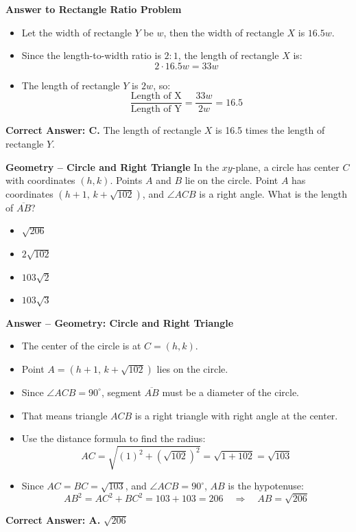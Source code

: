 \documentclass{beamer}
\begin{document}
\begin{frame}{\textbf{Answer to Rectangle Ratio Problem}}
\begin{itemize}
    \item Let the width of rectangle \( Y \) be \( w \), then the width of rectangle \( X \) is \( 16.5w \).
    \item Since the length-to-width ratio is \( 2:1 \), the length of rectangle \( X \) is:
    \[
    2 \cdot 16.5w = 33w
    \]
    \item The length of rectangle \( Y \) is \( 2w \), so:
    \[
    \frac{\text{Length of X}}{\text{Length of Y}} = \frac{33w}{2w} = 16.5
    \]
\end{itemize}

\textbf{Correct Answer: C. } The length of rectangle \( X \) is 16.5 times the length of rectangle \( Y \).
\end{frame}




\begin{frame}{\textbf{Geometry – Circle and Right Triangle}}
In the \(xy\)-plane, a circle has center \(C\) with coordinates \((h, k)\). Points \(A\) and \(B\) lie on the circle. Point \(A\) has coordinates \((h + 1,\, k + \sqrt{102})\), and \(\angle ACB\) is a right angle. What is the length of \(\overline{AB}\)?
\begin{itemize}
    \item[A.] \(\sqrt{206}\)
    \item[B.] \(2\sqrt{102}\)
    \item[C.] \(103\sqrt{2}\)
    \item[D.] \(103\sqrt{3}\)
\end{itemize}
\end{frame}



\begin{frame}{\textbf{Answer – Geometry: Circle and Right Triangle}}
\begin{itemize}
    \item The center of the circle is at \(C = (h, k)\).
    \item Point \(A = (h + 1,\, k + \sqrt{102})\) lies on the circle.
    \item Since \(\angle ACB = 90^\circ\), segment \(\overline{AB}\) must be a diameter of the circle.
    \item That means triangle \(ACB\) is a right triangle with right angle at the center.
    \item Use the distance formula to find the radius:
    \[
    AC = \sqrt{(1)^2 + (\sqrt{102})^2} = \sqrt{1 + 102} = \sqrt{103}
    \]
    \item Since \(AC = BC = \sqrt{103}\), and \(\angle ACB = 90^\circ\), \(AB\) is the hypotenuse:
    \[
    AB^2 = AC^2 + BC^2 = 103 + 103 = 206 \quad \Rightarrow \quad AB = \sqrt{206}
    \]
\end{itemize}
\textbf{Correct Answer: A. } \(\sqrt{206}\)
\end{frame}
\end{document}
